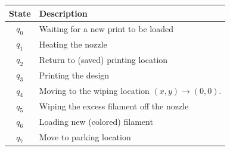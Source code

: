 \documentclass[a4paper,11pt]{article}
\begin{document}
\begin{figure}[H]
    \begin{minipage}{0.5\linewidth}
        \vspace{0pt}
        \centering
        \captionsetup{width=\linewidth,font=small}
        \label{tab:fsm-states}

        \small
        \renewcommand{\arraystretch}{1.2}
        \begin{tabularx}{\linewidth}{
            @{}c >{\raggedright\arraybackslash}X@{}
        }
            \toprule
            \textbf{State} & \textbf{Description} \\
            \midrule
            $q_0$ & Waiting for a new print to be loaded \\
            $q_1$ & Heating the nozzle \\
            $q_2$ & Return to (saved) printing location \\
            $q_3$ & Printing the design \\
            $q_4$ & Moving to the wiping location $(x,y)\rightarrow(0,0)$. \\
            $q_5$ & Wiping the excess filament off the nozzle \\
            $q_6$ & Loading new (colored) filament\\
            $q_7$ & Move to parking location \\
            \bottomrule
        \end{tabularx}
    \end{minipage}
    \hfill
        \begin{minipage}{0.48\linewidth}
        \vspace{0pt}
        \centering
        \captionsetup{width=\linewidth,font=small}
        \label{tab:fsm-events}


\end{minipage}
\end{figure}
\end{document}
